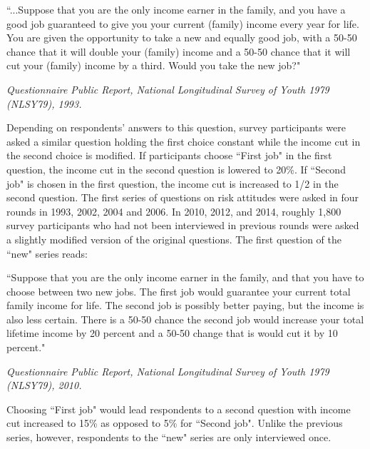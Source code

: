 \documentclass[]{article}
\begin{document}
\begin{center}
\begin{minipage}[!h]{.9\linewidth}\small
	``...Suppose that you are the only income earner in the family, and you have a good job guaranteed to give you your current (family) income every year for life. You are given the opportunity to take a new and equally good job, with a 50-50 chance that it will double your (family) income and a 50-50 chance that it will cut your (family) income by a third. Would you take the new job?"
\end{minipage}
\end{center}
\begin{flushright}
	\textit{Questionnaire Public Report, National Longitudinal Survey of Youth 1979 (NLSY79), 1993.}
\end{flushright}
Depending on respondents' answers to this question, survey participants were asked a similar question holding the first choice constant while the income cut in the second choice is modified. If participants choose ``First job" in the first question, the income cut in the second question is lowered to 20\%. If ``Second job" is chosen in the first question, the income cut is increased to 1/2 in the second question. The first series of questions on risk attitudes were asked in four rounds in 1993, 2002, 2004 and 2006. In 2010, 2012, and 2014, roughly 1,800 survey participants who had not been interviewed in previous rounds were asked a slightly modified version of the original questions. The first question of the ``new" series reads:

\begin{center}
\begin{minipage}{.9\linewidth}\small
	``Suppose that you are the only income earner in the family, and that you have to choose between two new jobs. The first job would guarantee your current total family income for life. The second job is possibly better paying, but the income is also less certain. There is a 50-50 chance the second job would increase your total lifetime income by 20 percent and a 50-50 change that is would cut it by 10 percent."
\end{minipage}
\end{center} 
\begin{flushright}
	\textit{Questionnaire Public Report, National Longitudinal Survey of Youth 1979 (NLSY79), 2010.}
\end{flushright}
Choosing ``First job" would lead respondents to a second question with income cut increased to 15\% as opposed to 5\% for ``Second job". Unlike the previous series, however, respondents to the ``new" series are only interviewed once. 
\end{document}
